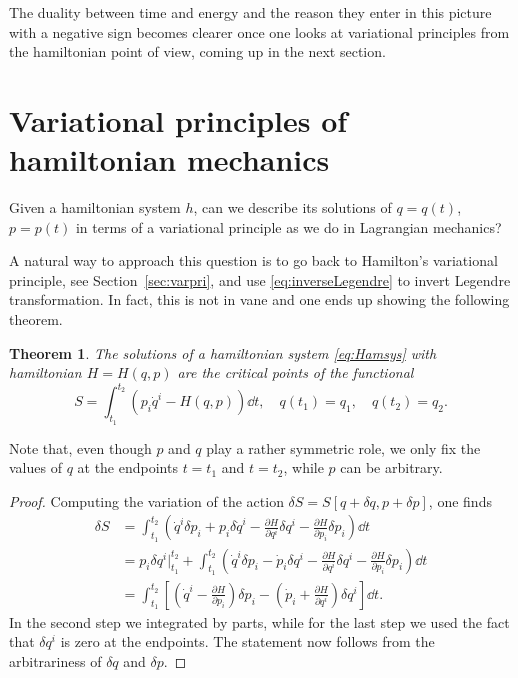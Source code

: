 \documentclass[english,fontsize=11pt,paper=b5]{scrbook}
\numberwithin{equation}{chapter}
\newtheorem{theorem}{Theorem}[chapter]
\theoremstyle{definition}
\begin{document}
    The duality between time and energy and the reason they enter in this picture with a negative sign becomes clearer once one looks at variational principles from the hamiltonian point of view, coming up in the next section.

    \section{Variational principles of hamiltonian mechanics}

    Given a hamiltonian system $h$, can we describe its solutions of $q=q(t)$, $p=p(t)$ in terms of a variational principle as we do in Lagrangian mechanics?

    A natural way to approach this question is to go back to Hamilton's variational principle, see Section~\ref{sec:varpri}, and use \eqref{eq:inverseLegendre} to invert Legendre transformation.
    In fact, this is not in vane and one ends up showing the following theorem.

    \begin{theorem}\label{thm:variationalHamilton}
      The solutions of a hamiltonian system \eqref{eq:Hamsys} with hamiltonian $H=H(q,p)$ are the critical points of the functional
      \begin{equation}\label{eq:variationalHamilton}
        S = \int_{t_1}^{t_2} \left(p_i\dot q^i - H(q,p)\right) \dd t,
        \quad q(t_1) = q_1, \quad q(t_2) = q_2.
      \end{equation}
    \end{theorem}
    Note that, even though $p$ and $q$ play a rather symmetric role, we only fix the values of $q$ at the endpoints $t=t_1$ and $t=t_2$, while $p$ can be arbitrary.

    \begin{proof}
      Computing the variation of the action $\delta S = S[q+\delta q, p + \delta p]$, one finds
      \begin{align}
        \delta S
     & = \int_{t_1}^{t_2} \left( \dot q^i \delta p_i + p_i \delta \dot q^i - \frac{\partial H}{\partial q^i}\delta q^i - \frac{\partial H}{\partial p_i}\delta p_i \right) \dd t                                   \\
     & = p_i \delta q^i\Big|_{t_1}^{t_2} + \int_{t_1}^{t_2} \left( \dot q^i \delta p_i - \dot p_i \delta q^i - \frac{\partial H}{\partial q^i}\delta q^i - \frac{\partial H}{\partial p_i}\delta p_i \right) \dd t \\
     & = \int_{t_1}^{t_2} \left[
       \left(\dot q^i - \frac{\partial H}{\partial p_i} \right) \delta p_i
       - \left(\dot p_i + \frac{\partial H}{\partial q^i}\right) \delta q^i
     \right] \dd t.
      \end{align}
      In the second step we integrated by parts, while for the last step we used the fact that $\delta q^i$ is zero at the endpoints.
      The statement now follows from the arbitrariness of $\delta q$ and $\delta p$.
    \end{proof}
\end{document}
